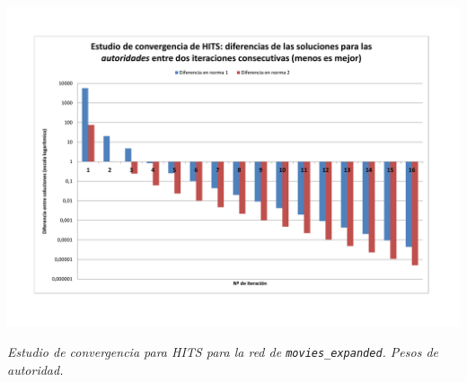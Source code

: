 	\par 
	\begin{center}
		\includegraphics[scale=0.12]{./img/graficoAutoridadesMovies.png}
		\par
		\footnotesize\textit{Estudio de convergencia para HITS para la red de \texttt{movies\_expanded}. Pesos de autoridad.}
	\end{center}
	\par 
	
